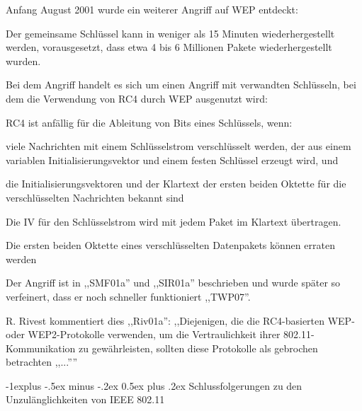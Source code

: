 \documentclass[a4paper]{article}
\makeatletter
\renewcommand{\subsection}{\@startsection{subsection}{2}{0mm}%
 {-1explus -.5ex minus -.2ex}%
 {0.5ex plus .2ex}%
 {\normalfont\normalsize\bfseries}}
\makeatother
\begin{document}
\begin{multicols}{3}
      \begin{itemize*}
            \item Anfang August 2001 wurde ein weiterer Angriff auf WEP entdeckt:
            \begin{itemize*}
                  \item Der gemeinsame Schlüssel kann in weniger als 15 Minuten wiederhergestellt werden, vorausgesetzt, dass etwa 4 bis 6 Millionen Pakete wiederhergestellt wurden.
                  \item Bei dem Angriff handelt es sich um einen Angriff mit verwandten Schlüsseln, bei dem die Verwendung von RC4 durch WEP ausgenutzt wird:
                  \begin{itemize*} \item RC4 ist anfällig für die Ableitung von Bits eines Schlüssels, wenn:
                        \begin{itemize*} \item viele Nachrichten mit einem Schlüsselstrom verschlüsselt werden, der aus einem variablen Initialisierungsvektor und einem festen Schlüssel erzeugt wird, und \item die Initialisierungsvektoren und der Klartext der ersten beiden Oktette für die verschlüsselten Nachrichten bekannt sind \end{itemize*} \item Die IV für den Schlüsselstrom wird mit jedem Paket im Klartext übertragen. \item Die ersten beiden Oktette eines verschlüsselten Datenpakets können erraten werden \end{itemize*}
                  \item Der Angriff ist in ,,SMF01a'' und ,,SIR01a'' beschrieben und wurde später so verfeinert, dass er noch schneller funktioniert ,,TWP07''.
                  \item R. Rivest kommentiert dies ,,Riv01a'': ,,Diejenigen, die die RC4-basierten WEP- oder WEP2-Protokolle verwenden, um die Vertraulichkeit ihrer 802.11-Kommunikation zu gewährleisten, sollten diese Protokolle als gebrochen betrachten ,,...''''
            \end{itemize*}
      \end{itemize*}


      \subsection{Schlussfolgerungen zu den Unzulänglichkeiten von IEEE
            802.11}


\end{multicols}
\end{document}
